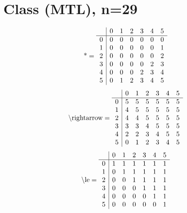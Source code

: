 \documentclass[11pt]{article}
\begin{document}
\section{Class (MTL), n=29}
\[\text{*} = 
\begin{array}{r | r r r r r r}
 & 0 & 1 & 2 & 3 & 4 & 5 \\ \hline
0 & 0 & 0 & 0 & 0 & 0 & 0 \\
1 & 0 & 0 & 0 & 0 & 0 & 1 \\
2 & 0 & 0 & 0 & 0 & 0 & 2 \\
3 & 0 & 0 & 0 & 0 & 2 & 3 \\
4 & 0 & 0 & 0 & 2 & 3 & 4 \\
5 & 0 & 1 & 2 & 3 & 4 & 5 \\
\end{array}
\]
\[\text{\textbackslash rightarrow} = 
\begin{array}{r | r r r r r r}
 & 0 & 1 & 2 & 3 & 4 & 5 \\ \hline
0 & 5 & 5 & 5 & 5 & 5 & 5 \\
1 & 4 & 5 & 5 & 5 & 5 & 5 \\
2 & 4 & 4 & 5 & 5 & 5 & 5 \\
3 & 3 & 3 & 4 & 5 & 5 & 5 \\
4 & 2 & 2 & 3 & 4 & 5 & 5 \\
5 & 0 & 1 & 2 & 3 & 4 & 5 \\
\end{array}
\]
\[\text{\textbackslash le} = 
\begin{array}{r | r r r r r r}
 & 0 & 1 & 2 & 3 & 4 & 5 \\ \hline
0 & 1 & 1 & 1 & 1 & 1 & 1 \\
1 & 0 & 1 & 1 & 1 & 1 & 1 \\
2 & 0 & 0 & 1 & 1 & 1 & 1 \\
3 & 0 & 0 & 0 & 1 & 1 & 1 \\
4 & 0 & 0 & 0 & 0 & 1 & 1 \\
5 & 0 & 0 & 0 & 0 & 0 & 1 \\
\end{array}
\]
\end{document}
